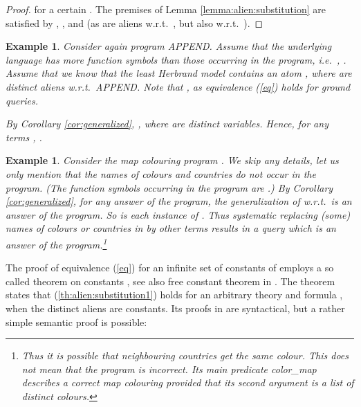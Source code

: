 \documentclass[a4paper]{tlp2}
\newtheorem{example}[theorem]{Example}
\begin{document}
\begin{proof}
 for a certain  .
The premises of Lemma \ref{lemma:alien:substitution}  
are satisfied by , , and 
(as  are aliens w.r.t.\ , but also w.r.t.\ ).
\end{proof}

\begin{example}
Consider again program APPEND.  Assume that the underlying language 
has more function symbols than those occurring in the program, 
i.e.\  ,  .
Assume that we know that the least Herbrand model 
contains an atom
  ,
where  are distinct aliens w.r.t.\ APPEND.
Note that , as equivalence (\ref{eq}) holds for ground queries.
{\sloppy\par}



By Corollary \ref{cor:generalized},
  ,
where  are distinct variables.
Hence, for any terms ,
\mbox{}.
{\sloppy\par}
\end{example}




\begin{example}
 Consider the map colouring program  \cite[Program 14.4]{Sterling-Shapiro}.
We skip any details, let us only mention that the names of colours and
 countries do not occur in the program.
 (The function symbols occurring in the program are 
 .)
By Corollary  \ref{cor:generalized},
 for any answer  of the program,
 the generalization  of  w.r.t.\  is an
 answer of the program.  So is each instance of .  
 Thus systematic replacing (some) names of colours or countries in  by
 other terms results in a query  which is an answer of the program.\footnote{Thus it is possible that neighbouring countries get the same colour.
This does not mean that the program is incorrect.
Its main predicate {\it color\_map}
describes a correct map colouring provided that its second argument
is a list of distinct colours.
} 
\end{example}











The proof of equivalence (\ref{eq})
for an infinite set of constants of 
\cite[proof of Prop.\,6]{DBLP:books/mk/minker88/Maher88} employs a so called
theorem on constants  \cite{shoenfield67},
see also free constant theorem in \cite[p.\,56]{HandbookLAILP:FOL}.
The theorem states that (\ref{th:alien:substitution1}) holds for an arbitrary
theory  and formula , when the distinct aliens  are constants.
Its proofs in \cite{shoenfield67,HandbookLAILP:FOL} are syntactical, but a
rather simple semantic proof is possible:
\end{document}
